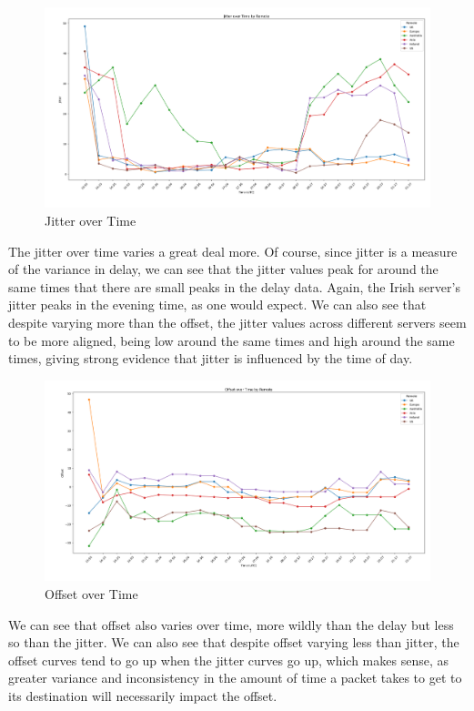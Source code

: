 \documentclass[a4paper]{article}
\begin{document}
\begin{figure}[H]
    \centering
    \includegraphics[width=\textwidth]{./images/jitterplot.png}
    \caption{Jitter over Time}
\end{figure}

The jitter over time varies a great deal more.
Of course, since jitter is a measure of the variance in delay, we can see that the jitter values peak for around the same times that there are small peaks in the delay data.
Again, the Irish server's jitter peaks in the evening time, as one would expect.
We can also see that despite varying more than the offset, the jitter values across different servers seem to be more aligned, being low around the same times and high around the same times, giving strong evidence that jitter is influenced by the time of day.

\begin{figure}[H]
    \centering
    \includegraphics[width=\textwidth]{./images/offsetplot.png}
    \caption{Offset over Time}
\end{figure}

We can see that offset also varies over time, more wildly than the delay but less so than the jitter.
We can also see that despite offset varying less than jitter, the offset curves tend to go up when the jitter curves go up, which makes sense, as greater variance and inconsistency in the amount of time a packet takes to get to its destination will necessarily impact the offset.
\end{document}
